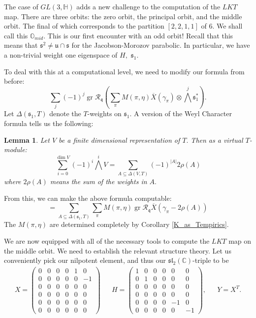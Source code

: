 \documentclass[letterpaper,twosided,11pt]{article}
\theoremstyle{plain}
\newtheorem{lemma}[theorem]{Lemma}
\theoremstyle{definition}
\theoremstyle{remark}
\newcommand{\C}{\mathbb{C}}
\newcommand{\HH}{\mathbb{H}}
\newcommand{\OO}{\mathbb{O}}
\newcommand{\Mat}[1]{\begin{pmatrix}#1\end{pmatrix}}
\newcommand{\tensor}{\otimes}
\newcommand{\lie}[1]{\mathfrak{#1}}
\begin{document}
The case of $ GL(3,\HH) $ adds a new challenge to the computation of the
$ LKT $ map.  There are three orbits:  the zero orbit, the principal
orbit, and the middle orbit.  The final of which corresponds to the
partition $ [2,2,1,1] $ of $ 6. $ We shall call this $ \OO_{mid}. $ This is
our first encounter with an odd orbit!  Recall that this means that $
\lie{s}^2\neq \lie{u}\cap \lie{s} $ for the Jacobson-Morozov parabolic.
In particular, we have a non-trivial weight one eigenspace of $ H, $ $
\lie{s}_1. $

To deal with this at a computational level, we need to modify our
formula from before:
\[
    \sum_{j}(-1)^j
    \operatorname{gr}
    \mathcal{R}_\lie{q}\left(\sum_{\pi} M(\pi,\eta) \overline{X}(\gamma_\pi)\tensor
    \textstyle{\bigwedge^j}\lie{s}_1^*\right).
\]
Let $ \Delta(\lie{s}_1,T) $ denote the $ T $-weights on $ \lie{s}_1. $ A
version of the Weyl Character formula tells us the following:

\begin{lemma}
    \cite[Corollary 12.2(d)]{AdamsVogan2021} Let $ V $ be a finite
    dimensional representation of $ T. $ Then as a virtual $ T $-module:
    \[
        \sum_{i=0}^{\dim V} (-1)^i \textstyle{\bigwedge^i} V=\displaystyle\sum_
        {A\subseteq \Delta(V,T)} (-1)^{|A|} 2\rho(A)
    \]
    where $ 2\rho(A) $ means the sum of the weights in $ A. $
\end{lemma}

From this, we can make the above formula computable:
\begin{equation}[A_\eta]
    =\sum_{A\subseteq \Delta(\lie{s}_1,T)} \sum_{\pi} M(\pi,\eta)
    \operatorname{gr}
    \mathcal{R}_\lie{q} \overline{X}(\gamma_\pi-2\rho(A))
\end{equation}
The $ M(\pi,\eta) $ are determined completely by Corollary \ref{K_as_Tempirics}.

We are now equipped with all of the necessary tools to compute the $ LKT
$ map on the middle orbit.  We need to establish the relevant structure
theory.  Let us conveniently pick our nilpotent element, and thus our $
\lie{sl}_2(\C) $-triple to be
\begin{align*}
    X=\Mat{ 0&0 &0 &0 & 1 & 0\\
    0& 0& 0& 0& 0& -1 \\
    0& 0& 0& 0& 0&0 \\
    0& 0& 0& 0& 0& 0\\
    0& 0& 0& 0& 0& 0\\
    0& 0& 0& 0& 0&0 } && H=\Mat{1 & 0 &0 &0 &0 &0 \\
    0 & 1 &0 &0 &0 &0\\
    0& 0& 0 &0 &0 &0 \\
    0& 0& 0& 0 &0 &0 \\
    0& 0& 0& 0& -1 &0 \\
    0 &0 &0 &0 &0 & -1}, && Y=X^T.
\end{align*}
\end{document}

